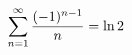 \documentclass[preview]{standalone}
\begin{document}
\begin{align*}
\special{dvisvgm:raw <g id='unique000'>}\displaystyle\sum_{n=1}^{\infty}\frac{(-1)^{n-1}}{n}=\ln 2\special{dvisvgm:raw </g>}
\end{align*}
\end{document}
